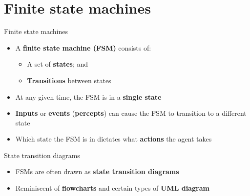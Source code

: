 \part{Finite state machines}
\frame{\partpage}

\begin{frame}{Finite state machines}
    \begin{itemize}
        \pause\item A \textbf{finite state machine (FSM)} consists of:
            \begin{itemize}
                \pause\item A set of \textbf{states}; and
                \pause\item \textbf{Transitions} between states
            \end{itemize}
        \pause\item At any given time, the FSM is in a \textbf{single state} 
        \pause\item \textbf{Inputs} or \textbf{events} (\textbf{percepts}) can cause the FSM to transition to a different state
        \pause\item Which state the FSM is in dictates what \textbf{actions} the agent takes
    \end{itemize}
\end{frame}

\begin{frame}{State transition diagrams}
    \begin{center}\end{center}
    \begin{itemize}
        \pause\item FSMs are often drawn as \textbf{state transition diagrams}
        \pause\item Reminiscent of \textbf{flowcharts} and certain types of \textbf{UML diagram} 
    \end{itemize}
\end{frame}

